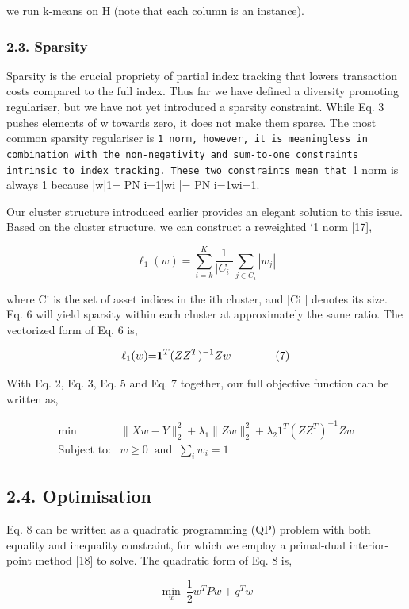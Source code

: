 \documentclass{article}
\begin{document}
we run k-means on H (note that each column is an instance).

\subsubsection{2.3. Sparsity}

Sparsity is the crucial propriety of partial index tracking that lowers transaction costs compared to the full index. Thus far we have defined a diversity promoting regulariser, but we have not yet introduced a sparsity constraint. While Eq. 3 pushes elements of w towards zero, it does not make them sparse. The most common sparsity regulariser is \verb|1 norm, however, it is meaningless in combination with the non-negativity and sum-to-one constraints intrinsic to index tracking. These two constraints mean that |1 norm is always 1 because |w|1= PN i=1|wi |= PN i=1wi=1.

Our cluster structure introduced earlier provides an elegant solution to this issue. Based on the cluster structure, we can construct a reweighted `1 norm [17],

$$\ell_{1}(w)=\sum_{i=k}^{K}\frac{1}{|C_{i}|}\sum_{j\in C_{i}}|w_{j}|\tag{6}$$

where Ci is the set of asset indices in the ith cluster, and |Ci | denotes its size. Eq. 6 will yield sparsity within each cluster at approximately the same ratio. The vectorized form of Eq. 6 is,

$$\ell_{1}(w){=}{\bf1}^{T}(Z Z^{T})^{-1}Z w\qquad\qquad(7)$$

With Eq. 2, Eq. 3, Eq. 5 and Eq. 7 together, our full objective function can be written as,

$$\begin{array}{ll}\min&\|Xw-Y\|_{2}^{2}+\lambda_{1}\|Zw\|_{2}^{2}+\lambda_{2}1^{T}(ZZ^{T})^{-1}Zw\\ \mbox{Subject to:}&w\!\geq\!0\;\;\mbox{and}\;\;\sum_{i}w_{i}\!=\!1\end{array}\tag{8}$$

\subsection{2.4. Optimisation}

Eq. 8 can be written as a quadratic programming (QP) problem with both equality and inequality constraint, for which we employ a primal-dual interior-point method [18] to solve. The quadratic form of Eq. 8 is,

$$\min_{w}\ \frac{1}{2}w^{T}Pw+q^{T}w\tag{9}$$
\end{document}
